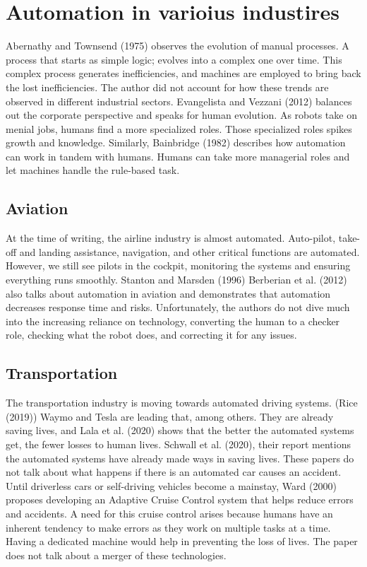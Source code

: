 \documentclass[
  man,floatsintext]{apa7}
\begin{document}
\hypertarget{automation-in-varioius-industires}{%
\section{Automation in varioius industires}\label{automation-in-varioius-industires}}

Abernathy and Townsend (1975) observes the evolution of manual processes. A process that starts as simple logic; evolves into a complex one over time. This complex process generates inefficiencies, and machines are employed to bring back the lost inefficiencies. The author did not account for how these trends are observed in different industrial sectors. Evangelista and Vezzani (2012) balances out the corporate perspective and speaks for human evolution. As robots take on menial jobs, humans find a more specialized roles. Those specialized roles spikes growth and knowledge. Similarly, Bainbridge (1982) describes how automation can work in tandem with humans. Humans can take more managerial roles and let machines handle the rule-based task.

\hypertarget{aviation}{%
\subsection{Aviation}\label{aviation}}

At the time of writing, the airline industry is almost automated. Auto-pilot, take-off and landing assistance, navigation, and other critical functions are automated. However, we still see pilots in the cockpit, monitoring the systems and ensuring everything runs smoothly. Stanton and Marsden (1996) Berberian et al. (2012) also talks about automation in aviation and demonstrates that automation decreases response time and risks. Unfortunately, the authors do not dive much into the increasing reliance on technology, converting the human to a checker role, checking what the robot does, and correcting it for any issues.

\hypertarget{transportation}{%
\subsection{Transportation}\label{transportation}}

The transportation industry is moving towards automated driving systems. (Rice (2019)) Waymo and Tesla are leading that, among others. They are already saving lives, and Lala et al. (2020) shows that the better the automated systems get, the fewer losses to human lives. Schwall et al. (2020), their report mentions the automated systems have already made ways in saving lives. These papers do not talk about what happens if there is an automated car causes an accident. Until driverless cars or self-driving vehicles become a mainstay, Ward (2000) proposes developing an Adaptive Cruise Control system that helps reduce errors and accidents. A need for this cruise control arises because humans have an inherent tendency to make errors as they work on multiple tasks at a time. Having a dedicated machine would help in preventing the loss of lives. The paper does not talk about a merger of these technologies.
\end{document}
